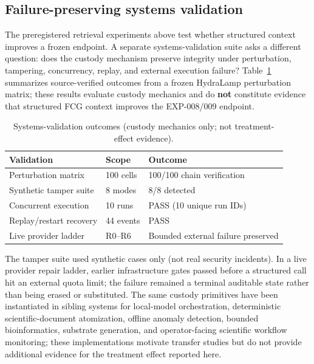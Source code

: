 \documentclass{article}
\begin{document}
\subsection{Failure-preserving systems validation}

The preregistered retrieval experiments above test whether structured context improves a frozen endpoint.
A separate systems-validation suite asks a different question: does the custody mechanism preserve integrity under perturbation, tampering, concurrency, replay, and external execution failure?
Table~\ref{tab:systems} summarizes source-verified outcomes from a frozen HydraLamp perturbation matrix; these results evaluate custody mechanics and do \textbf{not} constitute evidence that structured FCG context improves the EXP-008/009 endpoint.

\begin{table}[t]
  \centering
  \caption{Systems-validation outcomes (custody mechanics only; not treatment-effect evidence).}
  \label{tab:systems}
  \begin{tabular}{lll}
    \toprule
    Validation & Scope & Outcome \\
    \midrule
    Perturbation matrix & 100 cells & 100/100 chain verification \\
    Synthetic tamper suite & 8 modes & 8/8 detected \\
    Concurrent execution & 10 runs & PASS (10 unique run IDs) \\
    Replay/restart recovery & 44 events & PASS \\
    Live provider ladder & R0--R6 & Bounded external failure preserved \\
    \bottomrule
  \end{tabular}
\end{table}

The tamper suite used synthetic cases only (not real security incidents).
In a live provider repair ladder, earlier infrastructure gates passed before a structured call hit an external quota limit; the failure remained a terminal auditable state rather than being erased or substituted.
The same custody primitives have been instantiated in sibling systems for local-model orchestration, deterministic scientific-document atomization, offline anomaly detection, bounded bioinformatics, substrate generation, and operator-facing scientific workflow monitoring; these implementations motivate transfer studies but do not provide additional evidence for the treatment effect reported here.
\end{document}
